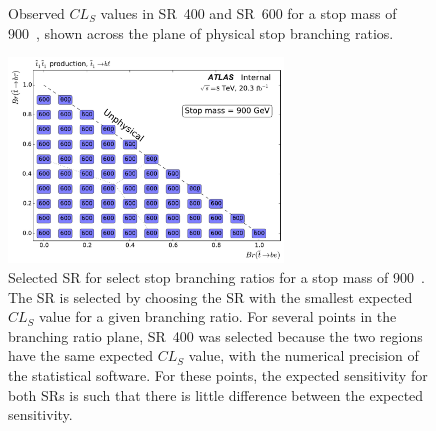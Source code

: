 \begin{figure}[ht]
  \centering
  \caption{
    Observed $CL_S$ values in SR~400 and SR~600 for a stop mass of 900~\GeV,
    shown across the plane of physical stop branching ratios.
  }
\end{figure}

\begin{figure}[ht]
  \centering
  \includegraphics[width=0.65\textwidth]
    {figs/blstop/region_selection/region_choice_vs_br_m_900.pdf}
  \caption{
    Selected SR for select stop branching ratios for a stop mass of 900~\GeV.
    The SR is selected by choosing the SR with the smallest expected $CL_S$
    value for a given branching ratio.
    For several points in the branching ratio plane, SR~400 was selected because
    the two regions have the same expected $CL_S$ value, with the numerical
    precision of the statistical software.
    For these points, the expected sensitivity for both SRs is such that
    there is little difference between the expected sensitivity.
  }
\end{figure}

